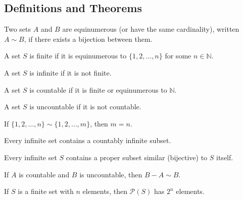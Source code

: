 \subsection*{Definitions and Theorems}

\begin{definition}
Two sets $A$ and $B$ are equinumerous (or have the same cardinality), written $A \sim B$, if there exists a bijection between them.
\end{definition}

\begin{definition}
A set $S$ is finite if it is equinumerous to $\{1, 2, \ldots, n\}$ for some $n \in \mathbb{N}$.
\end{definition}

\begin{definition}
A set $S$ is infinite if it is not finite.
\end{definition}

\begin{definition}
A set $S$ is countable if it is finite or equinumerous to $\mathbb{N}$.
\end{definition}

\begin{definition}
A set $S$ is uncountable if it is not countable.
\end{definition}

\begin{theorem}
If $\{1, 2, \ldots, n\} \sim \{1, 2, \ldots, m\}$, then $m = n$.
\end{theorem}

\begin{theorem}
Every infinite set contains a countably infinite subset.
\end{theorem}

\begin{theorem}
Every infinite set $S$ contains a proper subset similar (bijective) to $S$ itself.
\end{theorem}

\begin{theorem}
If $A$ is countable and $B$ is uncountable, then $B - A \sim B$.
\end{theorem}

\begin{theorem}
If $S$ is a finite set with $n$ elements, then $\mathcal{P}(S)$ has $2^n$ elements.
\end{theorem}

